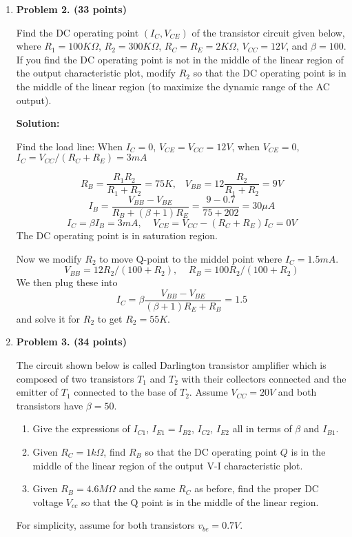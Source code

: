 \begin{enumerate}
\item {\bf Problem 2. (33 points)} 

Find the DC operating point $(I_C, V_{CE})$ of the transistor circuit 
given below, where $R_1=100K\Omega$, $R_2=300K\Omega$, $R_C=R_E=2K\Omega$, 
$V_{CC}=12V$, and $\beta=100$. If you find the DC operating point is not 
in the middle of the linear region of the output characteristic plot, 
modify $R_2$ so that the DC operating point is in the middle of the linear
region (to maximize the dynamic range of the AC output).


 {\bf Solution:} 
 
 Find the load line: 
 When $I_C=0$, $V_{CE}=V_{CC}=12V$, when $V_{CE}=0$, $I_C=V_{CC}/(R_C+R_E)=3mA$

 \[ R_{B}=\frac{R_1 R_2}{R_1+R_2}=75K,\;\;\;V_{BB}=12\frac{R_2}{R_1+R_2}=9V \]
 \[ I_B=\frac{V_{BB}-V_{BE}}{R_B+(\beta+1)R_E}=\frac{9-0.7}{75+202}=30\mu A \]
 \[ I_C=\beta I_B=3 mA, \;\;\;\;V_{CE}=V_{CC}-(R_C+R_E)I_C=0V \]
 The DC operating point is in saturation region.

 Now we modify $R_2$ to move Q-point to the middel point where $I_C=1.5mA$.
 \[ V_{BB}=12R_2/(100+R_2),\;\;\;\;R_B=100R_2/(100+R_2) \]
 We then plug these into 
 \[ I_C=\beta \frac{V_{BB}-V_{BE}}{(\beta+1) R_E+R_B}=1.5 \]
 and solve it for $R_2$ to get $R_2=55K$.


\item {\bf Problem 3. (34 points)} 

The circuit shown below is called Darlington transistor amplifier which is
composed of two transistors $T_1$ and $T_2$ with their collectors connected 
and the emitter of $T_1$ connected to the base of $T_2$. Assume $V_{CC}=20V$ 
and both transistors have $\beta=50$. 
\begin{enumerate}
\item Give the expressions of $I_{C1}$, $I_{E1}=I_{B2}$, $I_{C2}$, $I_{E2}$
  all in terms of $\beta$ and $I_{B1}$.
\item Given $R_C=1 k\Omega$, find $R_B$ so that the DC operating point $Q$
  is in the middle of the linear region of the output V-I characteristic plot.
\item Given $R_B= 4.6 M\Omega$ and the same $R_C$ as before, find the proper 
DC voltage $V_{cc}$ so that the Q point is in the middle of the linear region.
\end{enumerate}
For simplicity, assume for both transistors $v_{be}=0.7V$.


\end{enumerate}
